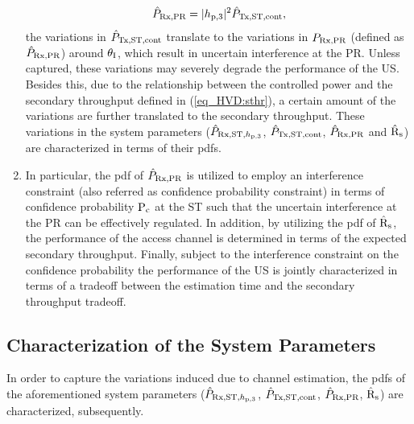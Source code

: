 \begin{enumerate}
\begin{align}
\hat{P}_{\text{Rx,PR}}  = |h_{\text{p,3}}|^2 \hat{P}_{\text{Tx,ST,cont}},
\label{eq_HVD:eprcvdpr}
\end{align}
the variations in $\hat{P}_{\text{Tx,ST,cont}}$ translate to the variations in $P_{\text{Rx,PR}}$ (defined as $\hat{P}_{\text{Rx,PR}}$) around $\theta_{\text{I}}$, which result in uncertain interference at the PR. Unless captured, these variations may severely degrade the performance of the US. Besides this, due to the relationship between the controlled power and the secondary throughput defined in (\ref{eq_HVD:sthr}), a certain amount of the variations are further translated to the secondary throughput. These variations in the system parameters ($\hat{P}_{\text{Rx,ST,$h_{\text{p,3}}$}}$, $\hat{P}_{\text{Tx,ST,cont}}$, $\hat{P}_{\text{Rx,PR}}$ and $\hat{\text{{R}}}_{\text{s}}$) are characterized in terms of their pdfs.  
	\item In particular, the pdf of $\hat{P}_{\text{Rx,PR}}$ is utilized to employ an interference constraint (also referred as confidence probability constraint) in terms of confidence probability $\text{P}_{\text{c}}$ at the ST such that the uncertain interference at the PR can be effectively regulated. In addition, by utilizing the pdf of $\hat{\text{{R}}}_{\text{s}}$, the performance of the access channel is determined in terms of the expected secondary throughput. Finally, subject to the interference constraint on the confidence probability the performance of the US is jointly characterized in terms of a tradeoff between the estimation time and the secondary throughput tradeoff. 
\end{enumerate}

\subsection{Characterization of the System Parameters}
In order to capture the variations induced due to channel estimation, the pdfs of the aforementioned system parameters ($\hat{P}_{\text{Rx,ST,$h_{\text{p,3}}$}}$, $\hat{P}_{\text{Tx,ST,cont}}$, $\hat{P}_{\text{Rx,PR}}$, $\hat{\text{{R}}}_{\text{s}}$) are characterized, subsequently. 

